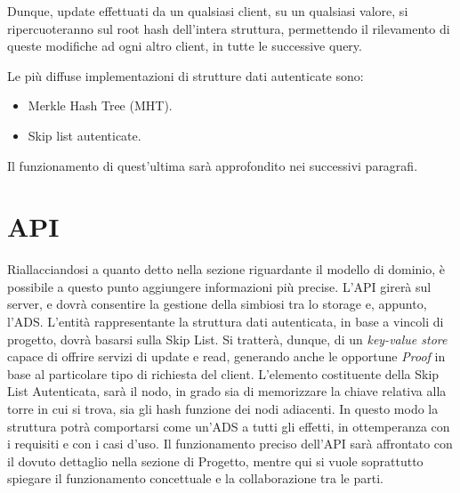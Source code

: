 		Dunque, update effettuati da un qualsiasi client, su un qualsiasi valore, si ripercuoteranno sul root hash dell'intera struttura, permettendo il rilevamento di queste modifiche ad ogni altro client, in tutte le successive query.
		
		Le più diffuse implementazioni di strutture dati autenticate sono:
		
		\begin{itemize}
			\item Merkle Hash Tree (MHT).
			\item Skip list autenticate.
		\end{itemize}
	
		Il funzionamento di quest'ultima sarà approfondito nei successivi paragrafi.
	
\section{API}

%	

	Riallacciandosi a quanto detto nella sezione riguardante il modello di dominio, è possibile a questo punto aggiungere informazioni più precise. L'API girerà sul server, e dovrà consentire la gestione della simbiosi tra lo storage e, appunto, l'ADS. L'entità rappresentante la struttura dati autenticata, in base a vincoli di progetto, dovrà basarsi sulla Skip List. Si tratterà, dunque, di un \textit{key-value store} capace di offrire servizi di update e read, generando anche le opportune \textit{Proof} in base al particolare tipo di richiesta del client. L'elemento costituente della Skip List Autenticata, sarà il nodo, in grado sia di memorizzare la chiave relativa alla torre in cui si trova, sia gli hash funzione dei nodi adiacenti. In questo modo la struttura potrà comportarsi come un'ADS a tutti gli effetti, in ottemperanza con i requisiti e con i casi d'uso. Il funzionamento preciso dell'API sarà affrontato con il dovuto dettaglio nella sezione di Progetto, mentre qui si vuole soprattutto spiegare il funzionamento concettuale e la collaborazione tra le parti.
	
